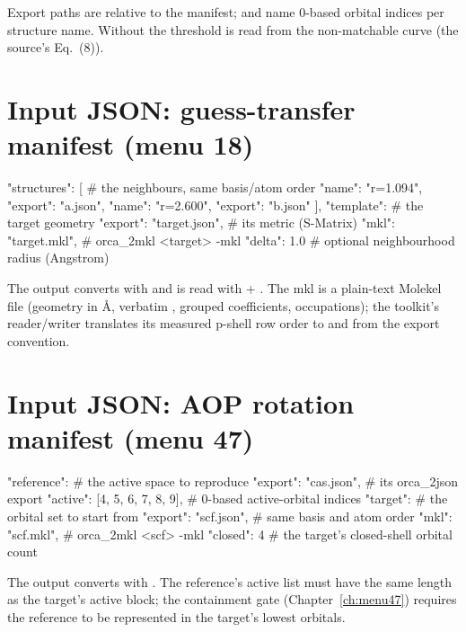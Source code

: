 Export paths are relative to the manifest;  and 
name 0-based orbital indices per structure name.  Without  the
threshold is read from the non-matchable curve (the source's Eq.~(8)).

\section{Input JSON: guess-transfer manifest (menu 18)}

\begin{codeblock}
{
  "structures": [                         # the neighbours, same basis/atom order
    {"name": "r=1.094", "export": "a.json"},
    {"name": "r=2.600", "export": "b.json"}
  ],
  "template": {                           # the target geometry
    "export": "target.json",              # its metric (S-Matrix)
    "mkl": "target.mkl"},                 # orca_2mkl <target> -mkl
  "delta": 1.0                            # optional neighbourhood radius (Angstrom)
}
\end{codeblock}

The output  converts with
 and is read with  +
.  The mkl is a plain-text Molekel file (geometry in \AA,
verbatim , grouped coefficients, occupations); the toolkit's
reader/writer translates its measured p-shell row order to and from the
export convention.

\section{Input JSON: AOP rotation manifest (menu 47)}

\begin{codeblock}
{
  "reference": {                          # the active space to reproduce
    "export": "cas.json",                 # its orca_2json export
    "active": [4, 5, 6, 7, 8, 9]},        # 0-based active-orbital indices
  "target": {                             # the orbital set to start from
    "export": "scf.json",                 # same basis and atom order
    "mkl": "scf.mkl"},                    # orca_2mkl <scf> -mkl
  "closed": 4                             # the target's closed-shell orbital count
}
\end{codeblock}

The output  converts with
.  The reference's active list
must have the same length as the target's active block; the containment
gate (Chapter~\ref{ch:menu47}) requires the reference to be represented in
the target's lowest  orbitals.

